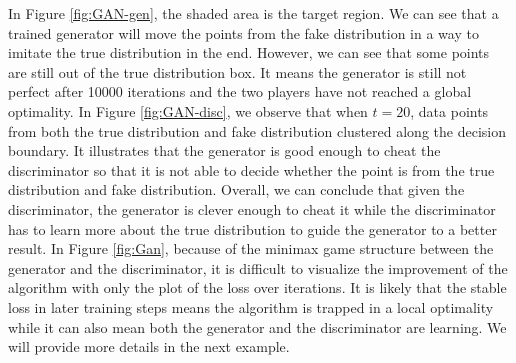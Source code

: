 In Figure \ref{fig:GAN-gen}, the shaded area is the target region. We can see that a trained generator will move the points from the fake distribution in a way to imitate the true distribution in the end. However, we can see that some points are still out of the true distribution box. It means the generator is still not perfect after 10000 iterations and the two players have not reached a global optimality. In Figure \ref{fig:GAN-disc}, we observe that when $t = 20$, data points from both the true distribution and fake distribution clustered along the decision boundary. It illustrates that the generator is good enough to cheat the discriminator so that it is not able to decide whether the point is from the true distribution and fake distribution. Overall, we can conclude that given the discriminator, the generator is clever enough to cheat it while the discriminator has to learn more about the true distribution to guide the generator to a better result. In Figure \ref{fig:Gan}, because of the minimax game structure between the generator and the discriminator, it is difficult to visualize the improvement of the algorithm with only the plot of the loss over iterations. It is likely that the stable loss in later training steps means the algorithm is trapped in a local optimality while it can also mean both the generator and the discriminator are learning. We will provide more details in the next example.
